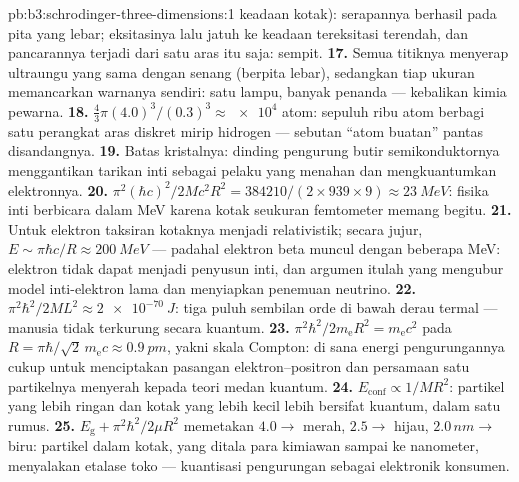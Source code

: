 \begin{solution}{pb:b3:schrodinger-three-dimensions:1}
keadaan kotak): serapannya berhasil pada pita yang lebar; eksitasinya
lalu jatuh ke keadaan tereksitasi terendah, dan pancarannya terjadi dari
satu aras itu saja: sempit.
\textbf{17.} Semua titiknya menyerap ultraungu yang sama dengan senang
(berpita lebar), sedangkan tiap ukuran memancarkan warnanya sendiri:
satu lampu, banyak penanda --- kebalikan kimia pewarna.
\textbf{18.} $\tfrac43\pi(4.0)^3/(0.3)^3 \approx \num{e4}$ atom:
sepuluh ribu atom berbagi satu perangkat aras diskret mirip hidrogen ---
sebutan ``atom buatan'' pantas disandangnya.
\textbf{19.} Batas kristalnya: dinding pengurung butir semikonduktornya
menggantikan tarikan inti sebagai pelaku yang menahan dan mengkuantumkan
elektronnya.
\textbf{20.} $\pi^2(\hbar c)^2/2Mc^2R^2 = 384210/(2 \times 939
\times 9) \approx \qty{23}{MeV}$: fisika inti berbicara dalam MeV karena
kotak seukuran femtometer memang begitu.
\textbf{21.} Untuk elektron taksiran kotaknya menjadi relativistik;
secara jujur, $E \sim \pi\hbar c/R \approx \qty{200}{MeV}$ --- padahal
elektron beta muncul dengan beberapa MeV: elektron tidak dapat menjadi
penyusun inti, dan argumen itulah yang mengubur model inti-elektron lama
dan menyiapkan penemuan neutrino.
\textbf{22.} $\pi^2\hbar^2/2ML^2 \approx \qty{2e-70}{J}$: tiga puluh
sembilan orde di bawah derau termal --- manusia tidak terkurung secara
kuantum.
\textbf{23.} $\pi^2\hbar^2/2m_{\text{e}}R^2 = m_{\text{e}}c^2$ pada
$R = \pi\hbar/\sqrt2\,m_{\text{e}}c \approx \qty{0.9}{pm}$, yakni skala
Compton: di sana energi pengurungannya cukup untuk menciptakan pasangan
elektron--positron dan persamaan satu partikelnya menyerah kepada teori
medan kuantum.
\textbf{24.} $E_{\text{conf}} \propto 1/MR^2$: partikel yang lebih
ringan dan kotak yang lebih kecil lebih bersifat kuantum, dalam satu
rumus.
\textbf{25.} $E_{\text{g}} + \pi^2\hbar^2/2\mu R^2$ memetakan $4.0 \to$
merah, $2.5 \to$ hijau, $2.0\,\unit{nm} \to$ biru: partikel dalam kotak,
yang ditala para kimiawan sampai ke nanometer, menyalakan etalase toko
--- kuantisasi pengurungan sebagai elektronik konsumen.
\end{solution}
